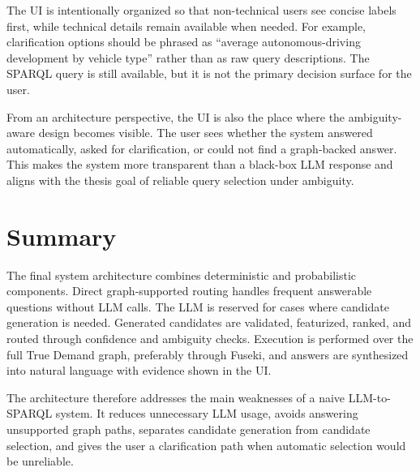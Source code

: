 The UI is intentionally organized so that non-technical users see concise labels first, while technical details remain available when needed. For example, clarification options should be phrased as ``average autonomous-driving development by vehicle type'' rather than as raw query descriptions. The SPARQL query is still available, but it is not the primary decision surface for the user.

From an architecture perspective, the UI is also the place where the ambiguity-aware design becomes visible. The user sees whether the system answered automatically, asked for clarification, or could not find a graph-backed answer. This makes the system more transparent than a black-box LLM response and aligns with the thesis goal of reliable query selection under ambiguity.

\section{Summary}
\label{sec:architecture-summary}

The final system architecture combines deterministic and probabilistic components. Direct graph-supported routing handles frequent answerable questions without LLM calls. The LLM is reserved for cases where candidate generation is needed. Generated candidates are validated, featurized, ranked, and routed through confidence and ambiguity checks. Execution is performed over the full True Demand graph, preferably through Fuseki, and answers are synthesized into natural language with evidence shown in the UI.

The architecture therefore addresses the main weaknesses of a naive LLM-to-SPARQL system. It reduces unnecessary LLM usage, avoids answering unsupported graph paths, separates candidate generation from candidate selection, and gives the user a clarification path when automatic selection would be unreliable.
